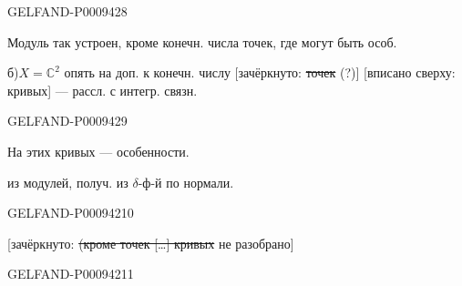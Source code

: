 \begin{GelfandAdjacentEvidence}{GELFAND-P000942}{8}


Модуль так устроен, кроме конечн. числа точек, где могут быть особ.

б)\enspace $X=\mathbb C^2$ опять на доп. к конечн. числу [зачёркнуто: \sout{точек} (?)]
[вписано сверху: кривых] --- рассл. с интегр. связн.
\end{GelfandAdjacentEvidence}
\begin{GelfandAdjacentEvidence}{GELFAND-P000942}{9}


На этих кривых --- особенности.

 из модулей, получ. из $\delta$-ф-й по нормали.
\end{GelfandAdjacentEvidence}
\begin{GelfandAdjacentEvidence}{GELFAND-P000942}{10}


[зачёркнуто: \sout{(кроме точек […] кривых} не разобрано]
\end{GelfandAdjacentEvidence}
\begin{GelfandAdjacentEvidence}{GELFAND-P000942}{11}

\end{GelfandAdjacentEvidence}


